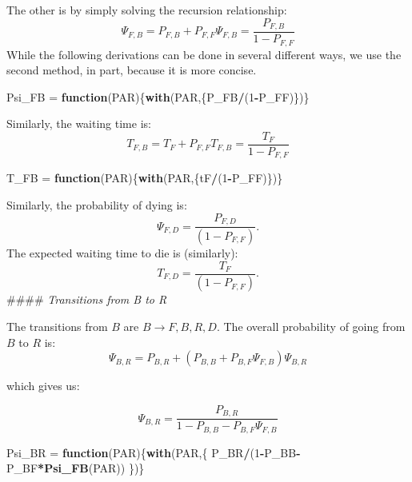 \documentclass[]{article}
\newenvironment{Shaded}{\begin{snugshade}}{\end{snugshade}}
\newcommand{\ControlFlowTok}[1]{\textcolor[rgb]{0.13,0.29,0.53}{\textbf{#1}}}
\newcommand{\DecValTok}[1]{\textcolor[rgb]{0.00,0.00,0.81}{#1}}
\newcommand{\KeywordTok}[1]{\textcolor[rgb]{0.13,0.29,0.53}{\textbf{#1}}}
\newcommand{\NormalTok}[1]{#1}
\newcommand{\OperatorTok}[1]{\textcolor[rgb]{0.81,0.36,0.00}{\textbf{#1}}}
\newcommand{\StringTok}[1]{\textcolor[rgb]{0.31,0.60,0.02}{#1}}
\begin{document}
The other is by simply solving the recursion relationship:
\[\Psi_{F,B} = P_{F,B} + P_{F,F} \Psi_{F,B} = \frac{P_{F,B}}{1-P_{F,F}}\]
While the following derivations can be done in several different ways,
we use the second method, in part, because it is more concise.

\begin{Shaded}
\begin{Highlighting}[]
\NormalTok{Psi_FB =}\StringTok{ }\ControlFlowTok{function}\NormalTok{(PAR)\{}\KeywordTok{with}\NormalTok{(PAR,\{P_FB}\OperatorTok{/}\NormalTok{(}\DecValTok{1}\OperatorTok{-}\NormalTok{P_FF)\})\}}
\end{Highlighting}
\end{Shaded}

Similarly, the waiting time is:
\[T_{F,B} =  T_F + P_{F,F} T_{F,B} = \frac{T_F}{1-P_{F,F}}\]

\begin{Shaded}
\begin{Highlighting}[]
\NormalTok{T_FB =}\StringTok{ }\ControlFlowTok{function}\NormalTok{(PAR)\{}\KeywordTok{with}\NormalTok{(PAR,\{tF}\OperatorTok{/}\NormalTok{(}\DecValTok{1}\OperatorTok{-}\NormalTok{P_FF)\})\}}
\end{Highlighting}
\end{Shaded}

Similarly, the probability of dying is:
\[\Psi_{F,D} = \frac{P_{F,D}}{(1-P_{F,F})}.\] The expected waiting time
to die is (similarly): \[T_{F,D} = \frac{T_F}{(1-P_{F,F})}.\] \#\#\#\#
\emph{Transitions from B to R}

The transitions from \(B\) are \(B\rightarrow {F,B,R,D}\). The overall
probability of going from \(B\) to \(R\) is:
\[\Psi_{B,R} = P_{B,R} + \left(P_{B,B} + P_{B,F} \Psi_{F,B} \right) \Psi_{B,R}\]

which gives us:

\[ \Psi_{B,R} = \frac{P_{B,R}}{1-P_{B,B} - P_{B,F} \Psi_{F,B}} \]

\begin{Shaded}
\begin{Highlighting}[]
\NormalTok{Psi_BR =}\StringTok{ }\ControlFlowTok{function}\NormalTok{(PAR)\{}\KeywordTok{with}\NormalTok{(PAR,\{}
\NormalTok{  P_BR}\OperatorTok{/}\NormalTok{(}\DecValTok{1}\OperatorTok{-}\NormalTok{P_BB}\OperatorTok{-}\NormalTok{P_BF}\OperatorTok{*}\KeywordTok{Psi_FB}\NormalTok{(PAR))}
\NormalTok{\})\}}
\end{Highlighting}
\end{Shaded}
\end{document}
